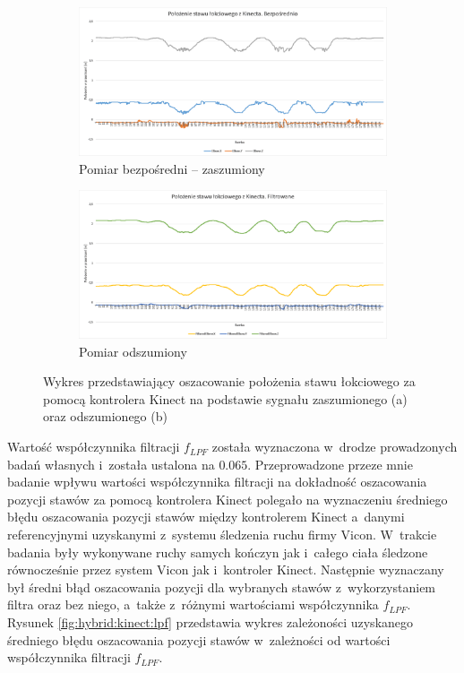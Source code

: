 \begin{figure}[!htb]
	\centering
	\begin{subfigure}[b]{0.49\textwidth}
		\centering
		\includegraphics{images/kinectElbowRaw.png}	
		\caption{Pomiar bezpośredni -- zaszumiony}
		\label{fig:hybrid:kinect:noised}
	\end{subfigure}
	\begin{subfigure}[b]{0.49\textwidth}
		\centering
		\includegraphics{images/kinectElbowFiltered.png}	
		\caption{Pomiar odszumiony}
		\label{fig:hybrid:kinect:denoised}
	\end{subfigure}				
	\caption{Wykres przedstawiający oszacowanie położenia stawu łokciowego za pomocą kontrolera Kinect na podstawie sygnału zaszumionego (a) oraz odszumionego (b)}
\end{figure}

Wartość współczynnika filtracji $f_{LPF}$ została wyznaczona w~drodze prowadzonych badań własnych i~została ustalona na $0.065$. Przeprowadzone przeze mnie badanie 
wpływu wartości współczynnika filtracji na dokładność oszacowania pozycji stawów za pomocą kontrolera Kinect polegało na wyznaczeniu średniego błędu oszacowania pozycji stawów między kontrolerem Kinect a~danymi referencyjnymi uzyskanymi z~systemu śledzenia ruchu firmy Vicon. W~trakcie badania były wykonywane ruchy samych kończyn jak i~całego ciała śledzone równocześnie przez system Vicon jak i~kontroler Kinect. Następnie wyznaczany był średni błąd oszacowania pozycji dla wybranych stawów z~wykorzystaniem filtra oraz bez niego, a~także z~różnymi wartościami współczynnika $f_{LPF}$. Rysunek \ref{fig:hybrid:kinect:lpf} przedstawia wykres zależoności uzyskanego średniego błędu oszacowania pozycji stawów w~zależności od wartości współczynnika filtracji $f_{LPF}$.


